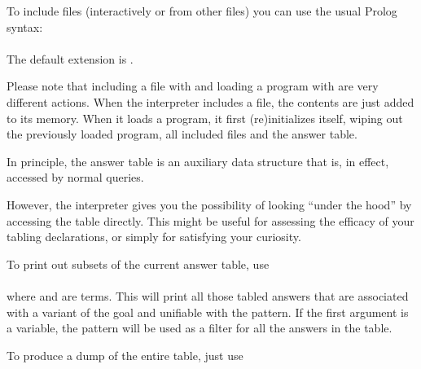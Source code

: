 
To include files (interactively or from other files) you can use the usual
Prolog syntax:\\
\ind
{}%
\label{dir:include}\\
The default extension is .%
%

Please note that including a file with   and
loading a program with  are very different
actions. When the interpreter includes a file, the contents are just
added to its memory. When it loads a program, it first (re)initializes
itself, wiping out the previously loaded program, all included files and the
answer table.



%

In principle, the answer table is an auxiliary data structure that is, in
effect, accessed by normal queries.

However, the interpreter gives you the possibility of looking ``under the
hood'' by accessing the table directly.  This might be useful for assessing
the efficacy of your tabling declarations, or simply for satisfying your
curiosity.

To print out subsets of the current answer table, use\\
\ind{}%
\label{dir:answers}\\
where  and  are terms.
This will print all those tabled answers that are associated with a variant
of the goal and unifiable with the pattern.  If the first argument is a
variable, the pattern will be used as a filter for all the answers in the
table.

To produce a dump of the entire table, just use\\
\ind{}




